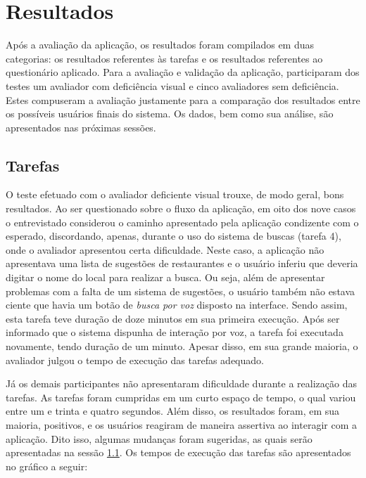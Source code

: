 \chapter{\label{chap:resultados}Resultados}

Após a avaliação da aplicação, os resultados foram compilados em duas categorias: os resultados referentes às tarefas e os resultados referentes ao questionário aplicado. Para a avaliação e validação da aplicação, participaram dos testes um avaliador com deficiência visual e cinco avaliadores sem deficiência. Estes compuseram a avaliação justamente para a comparação dos resultados entre os possíveis usuários finais do sistema. Os dados, bem como sua análise, são apresentados nas próximas sessões.

\section{Tarefas}

O teste efetuado com o avaliador deficiente visual trouxe, de modo geral, bons resultados. Ao ser questionado sobre o fluxo da aplicação, em oito dos nove casos o entrevistado considerou o caminho apresentado pela aplicação condizente com o esperado, discordando, apenas, durante o uso do sistema de buscas (tarefa 4), onde o avaliador apresentou certa dificuldade. Neste caso, a aplicação não apresentava uma lista de sugestões de restaurantes e o usuário inferiu que deveria digitar o nome do local para realizar a busca. Ou seja, além de apresentar problemas com a falta de um sistema de sugestões, o usuário também não estava ciente que havia um botão de \emph{busca por voz} disposto na interface. Sendo assim, esta tarefa teve duração de doze minutos em sua primeira execução. Após ser informado que o sistema dispunha de interação por voz, a tarefa foi executada novamente, tendo duração de um minuto. Apesar disso, em sua grande maioria, o avaliador julgou o tempo de execução das tarefas adequado.

Já os demais participantes não apresentaram dificuldade durante a realização das tarefas. As tarefas foram cumpridas em um curto espaço de tempo, o qual variou entre um e trinta e quatro segundos. Além disso, os resultados foram, em sua maioria, positivos, e os usuários reagiram de maneira assertiva ao interagir com a aplicação. Dito isso, algumas mudanças foram sugeridas, as quais serão apresentadas na sessão \ref{}. Os tempos de execução das tarefas são apresentados no gráfico a seguir:

